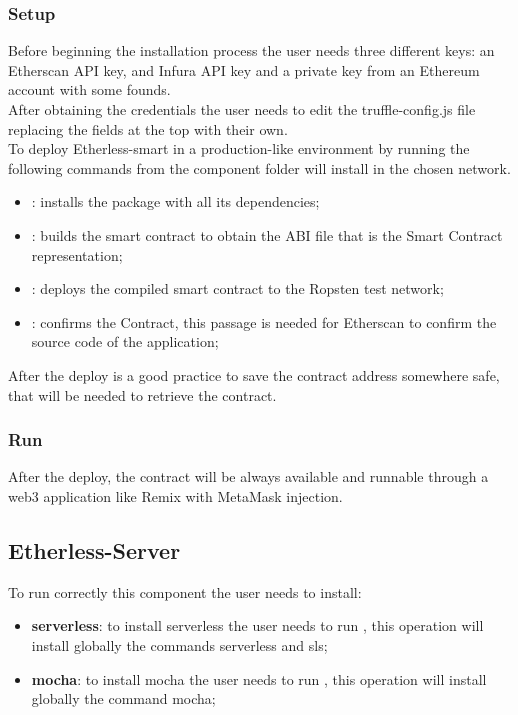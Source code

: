 \subsubsection{Setup}
Before beginning the installation process the user needs three different keys: an Etherscan API
key, and Infura API key and a private key from an Ethereum account with some founds.\\
After obtaining the credentials the user needs to edit the truffle-config.js file replacing the fields at the top
with their own. \\
To deploy Etherless-smart in a production-like environment
by running the following commands from the component folder will install in the chosen network.
\begin{itemize}
    \item {} : installs the package with all its dependencies;
    \item {}: builds the smart contract to obtain the ABI file that is the Smart Contract representation;
    \item {}: deploys the compiled smart contract to the Ropsten test network;
    \item {}: confirms the Contract, this passage is needed for Etherscan to confirm the source code of the application;
\end{itemize}
After the deploy is a good practice to save the contract address somewhere safe, that will be needed to retrieve the contract.
\subsubsection{Run}
After the deploy, the contract will be always available and runnable through a web3 application like Remix with MetaMask injection.
\subsection{Etherless-Server}
To run correctly this component the user needs to install:
\begin{itemize}
    \item \textbf{serverless}: to install serverless the user needs to run , this operation will install globally the commands serverless and sls;
    \item \textbf{mocha}: to install mocha the user needs to run , this operation will install globally the command mocha;
\end{itemize}
